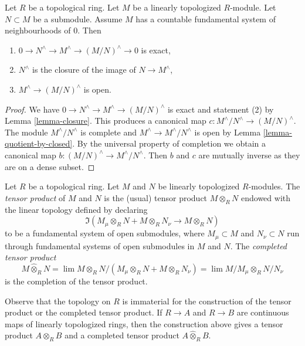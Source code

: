 \begin{lemma}
\label{lemma-ses}
\begin{reference}
\cite[Theorem 8.1]{Ma}
\end{reference}
Let $R$ be a topological ring. Let $M$ be a linearly topologized
$R$-module. Let $N \subset M$ be a submodule. Assume $M$ has a
countable fundamental system of neighbourhoods of $0$. Then
\begin{enumerate}
\item $0 \to N^\wedge \to M^\wedge \to (M/N)^\wedge \to 0$ is exact,
\item $N^\wedge$ is the closure of the image of $N \to M^\wedge$,
\item $M^\wedge \to (M/N)^\wedge$ is open.
\end{enumerate}
\end{lemma}

\begin{proof}
We have $0 \to N^\wedge \to M^\wedge \to (M/N)^\wedge$ is exact
and statement (2) by Lemma \ref{lemma-closure}.
This produces a canonical map $c : M^\wedge/N^\wedge \to (M/N)^\wedge$.
The module $M^\wedge/N^\wedge$ is complete and
$M^\wedge \to M^\wedge/N^\wedge$ is open by
Lemma \ref{lemma-quotient-by-closed}.
By the universal property of completion we obtain a canonical
map $b : (M/N)^\wedge \to M^\wedge/N^\wedge$.
Then $b$ and $c$ are mutually inverse as they are on a dense subset.
\end{proof}

\begin{definition}
\label{definition-toplogy-tensor-product}
Let $R$ be a topological ring. Let $M$ and $N$ be linearly
topologized $R$-modules. The {\it tensor product} of $M$ and $N$
is the (usual) tensor product $M \otimes_R N$ endowed
with the linear topology defined by declaring
$$
\Im(M_\mu \otimes_R N + M \otimes_R N_\nu \longrightarrow M \otimes_R N)
$$
to be a fundamental system of open submodules, where
$M_\mu \subset M$ and $N_\nu \subset N$ run through fundamental
systems of open submodules in $M$ and $N$.
The {\it completed tensor product}
$$
M \widehat{\otimes}_R N =
\lim M \otimes_R N/(M_\mu \otimes_R N + M \otimes_R N_\nu) =
\lim M/M_\mu \otimes_R N/N_\nu
$$
is the completion of the tensor product.
\end{definition}

\noindent
Observe that the topology on $R$ is immaterial for the construction
of the tensor product or the completed tensor product.
If $R \to A$ and $R \to B$ are continuous maps of
linearly topologized rings, then the construction above
gives a tensor product $A \otimes_R B$ and a completed
tensor product $A \widehat{\otimes}_R B$.

